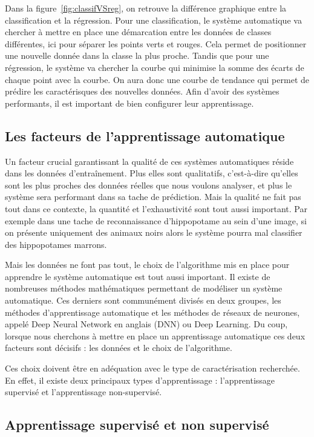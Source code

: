 

Dans la figure~\ref{fig:classifVSreg}, on retrouve la différence graphique entre la classification et la régression. Pour une classification, le système automatique va chercher à mettre en place une démarcation entre les données de classes différentes, ici pour séparer les points verts et rouges. Cela permet de positionner une nouvelle donnée dans la classe la plus proche. Tandis que pour une régression, le système va chercher la courbe qui minimise la somme des écarts de chaque point avec la courbe. On aura donc une courbe de tendance qui permet de prédire les caractérisques des nouvelles données.
Afin d'avoir des systèmes performants, il est important de bien configurer leur apprentissage.

\subsection{Les facteurs de l'apprentissage automatique}
Un facteur crucial garantissant la qualité de ces systèmes automatiques réside dans les données d’entraînement. Plus elles sont qualitatifs, c'est-à-dire qu'elles sont les plus proches des données réelles que nous voulons analyser, et plus le système sera performant dans sa tache de prédiction. Mais la qualité ne fait pas tout dans ce contexte, la quantité et l'exhaustivité sont tout aussi important. Par exemple dans une tache de reconnaissance d'hippopotame au sein d'une image, si on présente uniquement des animaux noirs alors le système pourra mal classifier des hippopotames marrons.

Mais les données ne font pas tout, le choix de l'algorithme mis en place pour apprendre le système automatique est tout aussi important. Il existe de nombreuses méthodes mathématiques permettant de modéliser un système automatique. Ces derniers sont communément divisés en deux groupes, les méthodes d'apprentissage automatique et les méthodes de réseaux de neurones, appelé Deep Neural Network en anglais (DNN) ou Deep Learning.
Du coup, lorsque nous cherchons à mettre en place un apprentissage automatique ces deux facteurs sont décisifs : les données et le choix de l'algorithme.

Ces choix doivent être en adéquation avec le type de caractérisation recherchée. En effet, il existe deux principaux types d'apprentissage : l'apprentissage supervisé et l'apprentissage non-supervisé.

\subsection{Apprentissage supervisé et non supervisé}

